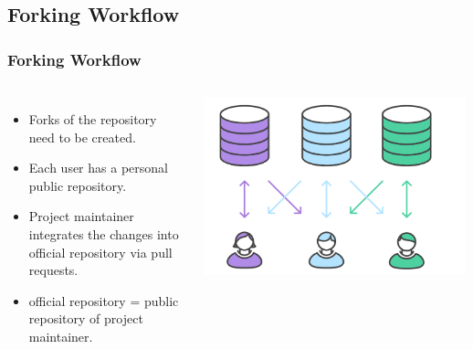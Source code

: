 \subsection[]{Forking Workflow}
\begin{frame}
\frametitle{Forking Workflow}
\begin{columns}
		\begin{itemize}
		\item Forks of the repository need to be created.
		\item Each user has a personal public repository.
		\item Project maintainer integrates the changes into official repository via pull requests.
		\item official repository = public repository of project maintainer.
		\end{itemize}
		\includegraphics[width=\textwidth, height=0.68\textwidth]{forking-workflow.png}
\end{columns}
\end{frame}
